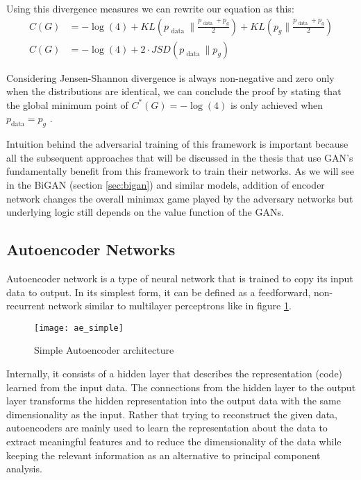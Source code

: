 Using this divergence measures we can rewrite our equation as this:
\begin{align}
    \label{eqn:gan_eqaul}
    C(G)&=-\log (4)+K L\left(p_{\text { data }} \| \frac{p_{\text { data }}+p_{g}}{2}\right)+K L\left(p_{g} \| \frac{p_{\text { data }}+p_{g}}{2}\right) \\
    C(G)&=-\log (4)+2 \cdot J S D\left(p_{\text { data }} \| p_{g}\right)
\end{align}

Considering Jensen-Shannon divergence is always non-negative and zero only when the distributions
are identical, we can conclude the proof by stating that the global minimum point of $C^*(G) = -
\log(4)$ is only achieved when $p_{\text{data}} = p_g$ .

Intuition behind the adversarial training of this framework is important because all the subsequent
approaches that will be discussed in the thesis that use GAN's fundamentally benefit from this
framework to train their networks. As we will see in the BiGAN (section \ref{sec:bigan}) and similar models, addition of
encoder network changes the overall minimax game played by the adversary networks but underlying
logic still depends on the value function of the GANs.

\subsection{Autoencoder Networks}
\label{sec:ae}
 
Autoencoder network is a type of neural network that is trained to copy its input data to output.
\cite{Goodfellow-et-al-2016} In its simplest form, it can be defined as a feedforward, non-
recurrent network similar to multilayer perceptrons like in figure \ref{fig:ae_simple}.
\begin{figure}[h!]
	\centering
	\texttt{[image: ae\_simple]}
    \caption{Simple Autoencoder architecture}
    \label{fig:ae_simple}
\end{figure}

Internally, it consists of a hidden layer that describes the representation (code) learned from the
input data. The connections from the hidden layer to the output layer transforms the hidden
representation into the output data with the same dimensionality as the input. Rather that trying to
reconstruct the given data, autoencoders are mainly used to learn the representation about the data
to extract meaningful features and to reduce the dimensionality of the data while keeping the
relevant information as an alternative to principal component analysis. 

